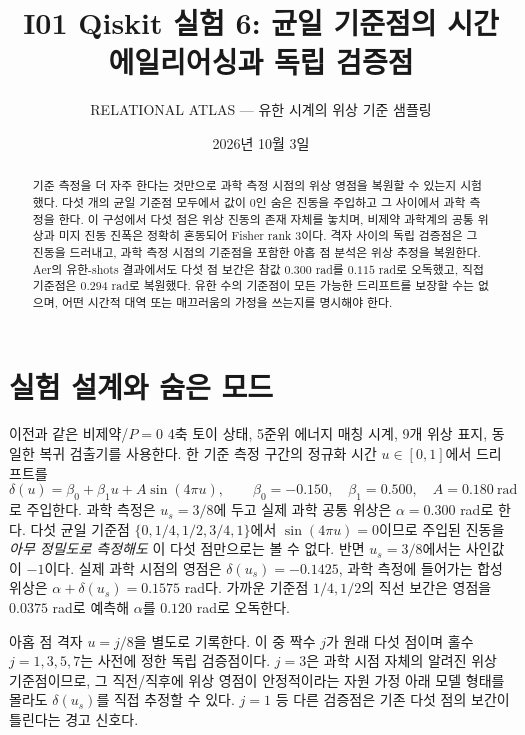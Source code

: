 \documentclass[11pt,a4paper]{article}
\title{I01 Qiskit 실험 6: 균일 기준점의 시간 에일리어싱과 독립 검증점}
\author{RELATIONAL ATLAS --- 유한 시계의 위상 기준 샘플링}
\date{2026년 10월 3일}
\begin{document}
\maketitle

\begin{abstract}
기준 측정을 더 자주 한다는 것만으로 과학 측정 시점의 위상 영점을
복원할 수 있는지 시험했다. 다섯 개의 균일 기준점 모두에서 값이 0인
숨은 진동을 주입하고 그 사이에서 과학 측정을 한다. 이 구성에서
다섯 점은 위상 진동의 존재 자체를 놓치며, 비제약 과학계의 공통 위상과
미지 진동 진폭은 정확히 혼동되어 Fisher rank 3이다. 격자 사이의
독립 검증점은 그 진동을 드러내고, 과학 측정 시점의 기준점을 포함한
아홉 점 분석은 위상 추정을 복원한다. Aer의 유한-shots 결과에서도
다섯 점 보간은 참값 $0.300$ rad를 $0.115$ rad로 오독했고, 직접
기준점은 $0.294$ rad로 복원했다. 유한 수의 기준점이 모든 가능한
드리프트를 보장할 수는 없으며, 어떤 시간적 대역 또는 매끄러움의
가정을 쓰는지를 명시해야 한다.
\end{abstract}

\section{실험 설계와 숨은 모드}
이전과 같은 비제약/$P=0$ 4축 토이 상태, 5준위 에너지 매칭 시계,
9개 위상 표지, 동일한 복귀 검출기를 사용한다. 한 기준 측정 구간의
정규화 시간 $u\in[0,1]$에서 드리프트를
\begin{equation}
 \delta(u)=\beta_0+\beta_1u+A\sin(4\pi u),\qquad
 \beta_0=-0.150,\quad\beta_1=0.500,\quad A=0.180\ \mathrm{rad}
 \label{eq:drift}
\end{equation}
로 주입한다. 과학 측정은 $u_s=3/8$에 두고 실제 과학 공통 위상은
$\alpha=0.300$ rad로 한다. 다섯 균일 기준점
$\{0,1/4,1/2,3/4,1\}$에서 $\sin(4\pi u)=0$이므로 주입된 진동을
\emph{아무 정밀도로 측정해도} 이 다섯 점만으로는 볼 수 없다.
반면 $u_s=3/8$에서는 사인값이 $-1$이다. 실제 과학 시점의 영점은
$\delta(u_s)=-0.1425$, 과학 측정에 들어가는 합성 위상은
$\alpha+\delta(u_s)=0.1575$ rad다. 가까운 기준점 $1/4,1/2$의
직선 보간은 영점을 $0.0375$ rad로 예측해 $\alpha$를 $0.120$ rad로
오독한다.

아홉 점 격자 $u=j/8$을 별도로 기록한다. 이 중 짝수 $j$가 원래
다섯 점이며 홀수 $j=1,3,5,7$는 사전에 정한 독립 검증점이다.
$j=3$은 과학 시점 자체의 알려진 위상 기준점이므로, 그 직전/직후에
위상 영점이 안정적이라는 자원 가정 아래 모델 형태를 몰라도
$\delta(u_s)$를 직접 추정할 수 있다. $j=1$ 등 다른 검증점은
기존 다섯 점의 보간이 틀린다는 경고 신호다.
\end{document}
